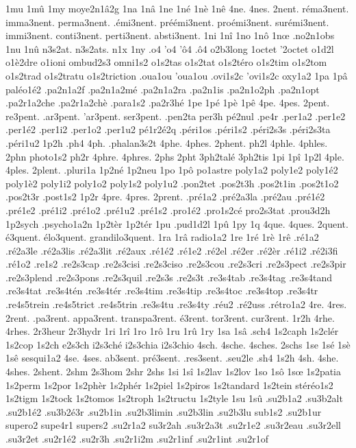 1mu
1mû
1my
moye2n1â2g
1na
1nâ
1ne
1né
1nè
1nê
4ne.
4nes.
2nent.
réma3nent.
imma3nent.
perma3nent.
.émi3nent.
préémi3nent.
proémi3nent.
surémi3nent.
immi3nent.
conti3nent.
perti3nent.
absti3nent.
1ni
1nî
1no
1nô
1nœ
.no2n1obs
1nu
1nû
n3s2at.
n3s2ats.
n1x
1ny
.o4
'o4
'ô4
.ô4
o2b3long
1octet
'2octet
o1d2l
o1è2dre
o1ioni
ombud2s3
omni1s2
o1s2tas
o1s2tat
o1s2téro
o1s2tim
o1s2tom
o1s2trad
o1s2tratu
o1s2triction
.oua1ou
'oua1ou
.ovi1s2c
'ovi1s2c
oxy1a2
1pa
1pâ
paléo1é2
.pa2n1a2f
.pa2n1a2mé
.pa2n1a2ra
.pa2n1is
.pa2n1o2ph
.pa2n1opt
.pa2r1a2che
.pa2r1a2chè
.para1s2
.pa2r3hé
1pe
1pé
1pè
1pê
4pe.
4pes.
2pent.
re3pent.
.ar3pent.
'ar3pent.
ser3pent.
%
.pen2ta
per3h
pé2nul
.pe4r
.per1a2
.per1e2
.per1é2
.per1i2
.per1o2
.per1u2
pé1r2é2q
.péri1os
.péri1s2
.péri2s3s
.péri2s3ta
.péri1u2
1p2h
.ph4
4ph.
.phalan3s2t
4phe.
4phes.
2phent.
ph2l
4phle.
4phles.
2phn
photo1s2
ph2r
4phre.
4phres.
2phs
2pht
3ph2talé
3ph2tis
1pi
1pî
1p2l
4ple.
4ples.
2plent.
.pluri1a
1p2né
1p2neu
1po
1pô
po1astre
poly1a2
poly1e2
poly1é2
poly1è2
poly1i2
poly1o2
poly1s2
poly1u2
.pon2tet
.pos2t3h
.pos2t1in
.pos2t1o2
.pos2t3r
.post1s2
1p2r
4pre.
4pres.
2prent.
.pré1a2
.pré2a3la
.pré2au
.pré1é2
.pré1e2
.pré1i2
.pré1o2
.pré1u2
.pré1s2
.pro1é2
.pro1s2cé
pro2s3tat
.prou3d2h
1p2sych
.psycho1a2n
1p2tèr
1p2tér
1pu
.pud1d2l
1pû
1py
1q
4que.
4ques.
2quent.
é3quent.
élo3quent.
grandilo3quent.
1ra
1râ
radio1a2
1re
1ré
1rè
1rê
.ré1a2
.ré2a3le
.ré2a3lis
.ré2a3lit
.ré2aux
.ré1é2
.ré1e2
.ré2el
.ré2er
.ré2èr
.ré1i2
.ré2i3fi
.ré1o2
.re1s2
.re2s3cap
.re2s3cisi
.re2s3ciso
.re2s3cou
.re2s3cri
.re2s3pect
.re2s3pir
.re2s3plend
.re2s3pons
.re2s3quil
.re2s3s
.re2s3t
.re3s4tab
.re3s4tag
.re3s4tand
.re3s4tat
.re3s4tén
.re3s4tér
.re3s4tim
.re3s4tip
.re3s4toc
.re3s4top
.re3s4tr
.re4s5trein
.re4s5trict
.re4s5trin
.re3s4tu
.re3s4ty
.réu2
.ré2uss
.rétro1a2
4re.
4res.
2rent.
.pa3rent.
appa3rent.
transpa3rent.
é3rent.
tor3rent.
cur3rent.
1r2h
4rhe.
4rhes.
2r3heur
2r3hydr
1ri
1rî
1ro
1rô
1ru
1rû
1ry
1sa
1sâ
.sch4
1s2caph
1s2clér
1s2cop
1s2ch
e2s3ch
i2s3ché
i2s3chia
i2s3chio
4sch.
4sche.
4sches.
2schs
1se
1sé
1sè
1sê
sesqui1a2
4se.
4ses.
ab3sent.
pré3sent.
.res3sent.
.seu2le
.sh4
1s2h
4sh.
4she.
4shes.
2shent.
2shm
2s3hom
2shr
2shs
1si
1sî
1s2lav
1s2lov
1so
1sô
1sœ
1s2patia
1s2perm
1s2por
1s2phèr
1s2phér
1s2piel
1s2piros
1s2tandard
1s2tein
stéréo1s2
1s2tigm
1s2tock
1s2tomos
1s2troph
1s2tructu
1s2tyle
1su
1sû
.su2b1a2
.su3b2alt
.su2b1é2
.su3b2é3r
.su2b1in
.su2b3limin
.su2b3lin
.su2b3lu
sub1s2
.su2b1ur
supero2
supe4r1
supers2
.su2r1a2
su3r2ah
.su3r2a3t
.su2r1e2
.su3r2eau
.su3r2ell
.su3r2et
.su2r1é2
.su2r3h
.su2r1i2m
.su2r1inf
.su2r1int
.su2r1of
